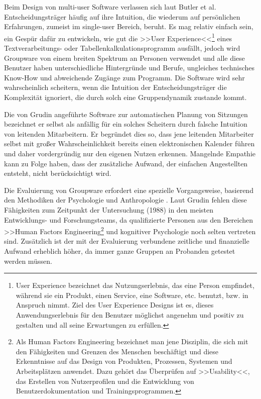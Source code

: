 \medskip Beim Design von multi-user Software verlassen sich laut Butler et al. \citep{ButlerK:1987} Entscheidungsträger häufig auf ihre Intuition, die wiederum auf persönlichen Erfahrungen, zumeist im single-user Bereich, beruht. Es mag relativ einfach sein, ein Gespür dafür zu entwickeln, wie gut die >>User Experience<<\footnote{User Experience bezeichnet das Nutzungserlebnis, das eine Person empfindet, während sie ein Produkt, einen Service, eine Software, etc. benutzt, bzw. in Anspruch nimmt. Ziel des User Experience Designs ist es, dieses Anwendungserlebnis für den Benutzer möglichst angenehm und positiv zu gestalten und all seine Erwartungen zu erfüllen.} eines Textverarbeitungs- oder Tabellenkalkulationsprogramm ausfällt, jedoch wird Groupware von einem breiten Spektrum an Personen verwendet und alle diese Benutzer haben unterschiedliche Hintergründe und Berufe, ungleiches technisches Know-How und abweichende Zugänge zum Programm. Die Software wird sehr wahrscheinlich scheitern, wenn die Intuition der Entscheidungsträger die Komplexität ignoriert, die durch solch eine Gruppendynamik zustande kommt. 

Die von Grudin \citep{Grudin:1988p126} angeführte Software zur automatischen Planung von Sitzungen bezeichnet er selbst als anfällig für ein solches Scheitern durch falsche Intuition von leitenden Mitarbeitern. Er begründet dies so, dass jene leitenden Mitarbeiter selbst mit großer Wahrscheinlichkeit bereits einen elektronischen Kalender führen und daher vordergründig nur den eigenen Nutzen erkennen. Mangelnde Empathie kann zu Folge haben, dass der zusätzliche Aufwand, der einfachen Angestellten entsteht, nicht berücksichtigt wird. 

\medskip Die Evaluierung von Groupware erfordert eine spezielle Vorgangsweise, basierend den Methodiken der Psychologie und Anthropologie \citep{Grudin:1988p126}. Laut Grudin fehlen diese Fähigkeiten zum Zeitpunkt der Untersuchung (1988) in den meisten Entwicklungs- und Forschungsteams, da qualifizierte Personen aus den Bereichen >>Human Factors Engineering\footnote{Als Human Factors Engineering bezeichnet man jene Disziplin, die sich mit den Fähigkeiten und Grenzen des Menschen beschäftigt und diese Erkenntnisse auf das Design von Produkten, Prozessen, Systemen und Arbeitsplätzen anwendet. Dazu gehört das Überprüfen auf >>Usability<<, das Erstellen von Nutzerprofilen und die Entwicklung von Benutzerdokumentation und Trainingsprogrammen.} und kognitiver Psychologie noch selten vertreten sind. Zusätzlich ist der mit der Evaluierung verbundene zeitliche und finanzielle Aufwand erheblich höher, da immer ganze Gruppen an Probanden getestet werden müssen.

